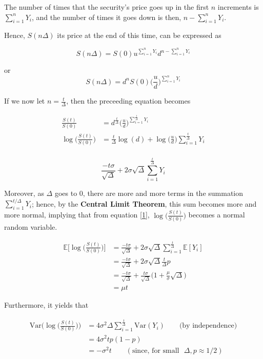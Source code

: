 \documentclass[12pt]{article}
\begin{document}
The number of times that the security's price goes up in the first $n$ increments is \(\sum_{i=1}^{n} Y_i \), and the number of times it goes down is then, \(n - \sum_{i=1}^{n} Y_i\).

Hence, $S(n\Delta)$ its price at the end of this time, can be expressed as 

\[ 
S(n \Delta) = S(0) u^{\sum_{i=1}^{n}Y_i} d^{n - \sum_{i=1}^{n} Y_i}
\]

or 
\[
S(n \Delta) = d^{n} S(0) \biggl( \frac{u}{d} \biggr)^{\sum_{i=1}^{n} Y_i}
\]

If we now let \( n = \frac{t}{\Delta} \), then the preceeding equation becomes 

\begin{align*}
    \frac{S(t)}{S(0)} &= d^{\frac{t}{\Delta}} \biggl( \frac{u}{d} \biggr)^{\sum_{i=1}^{\frac{t}{\Delta}} Y_i} \\
\log \biggl( \frac{S(t)}{S(0)} \biggr) &= \frac{t}{\Delta} \log{(d)} + \log{\biggl(\frac{u}{d}\biggr)} \sum_{i=1}^{\frac{t}{\Delta}} Y_i \\
\end{align*}

\begin{equation}\label{1}
    \frac{-t\sigma}{\sqrt{\Delta}} + 2 \sigma \sqrt{\Delta} \sum_{i=1}^{\frac{t}{\Delta}} Y_i
\end{equation}

Moreover, as $\Delta$ goes to 0, there are more and more terms in the summation $\sum_{i=1}^{t / \Delta} Y_i$; hence, by the \textbf{Central Limit Theorem}, this sum becomes more and more normal, implying that from equation \eqref{1}, $\log \biggl(\frac{S(t)}{S(0)}\biggr)$ becomes a normal random variable.

\begin{align*}
    \mathbb{E} \biggl[ \log \bigl( \frac{S(t)}{S(0)} \bigr)  \biggr] &= \frac{-t\sigma}{\sqrt{\Delta}} + 2 \sigma \sqrt{\Delta} \sum_{i=1}^{\frac{t}{\Delta}} \mathbb{E}[Y_i] \\
    &= \frac{-t\sigma}{\sqrt{\Delta}} + 2 \sigma \sqrt{\Delta} \frac{t}{\Delta} p \\
    &= \frac{-t\sigma}{\sqrt{\Delta}} + \frac{t\sigma}{\sqrt{\Delta}} \bigl( 1 + \frac{\mu}{\sigma}\sqrt{\Delta} \bigr) \\
    &= \mu t
\end{align*}

Furthermore, it yields that

\begin{align*}
   \text{Var} \bigl( \log \bigl( \frac{S(t)}{S(0)} \bigr)  \bigr) &= 4\sigma^2\Delta\sum_{i=1}^{\frac{t}{\Delta}} \text{Var}(Y_i) \qquad \text{(by independence)} \\ 
   &= 4 \sigma^2 t p ( 1- p) \\
   &= - \sigma^2t \qquad (\text{since, for small~~} \Delta, p \approx 1/2 )
\end{align*}
\end{document}
